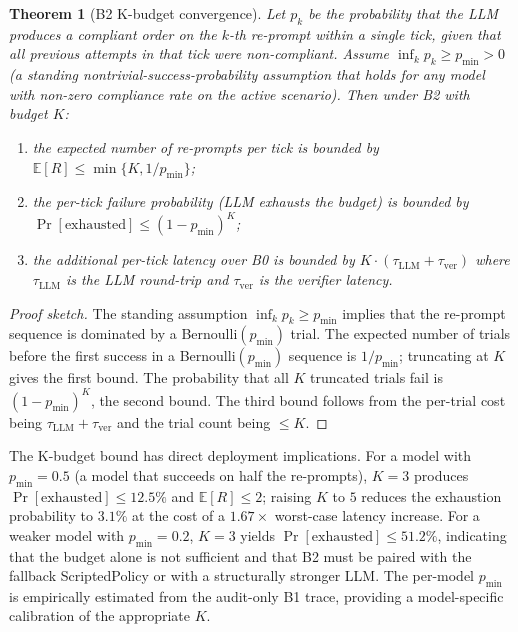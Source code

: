 \documentclass{article}
\newtheorem{theorem}{Theorem}[section]
\theoremstyle{definition}
\begin{document}
\begin{theorem}[B2 K-budget convergence]\label{thm:b2_kbudget}
Let $p_k$ be the probability that the LLM produces a compliant order on the $k$-th re-prompt within a single tick, given that all previous attempts in that tick were non-compliant. Assume $\inf_k p_k \geq p_{\min} > 0$ (a standing nontrivial-success-probability assumption that holds for any model with non-zero compliance rate on the active scenario). Then under B2 with budget $K$:
\begin{enumerate}[nosep]
    \item the expected number of re-prompts per tick is bounded by $\mathbb{E}[R] \leq \min\{K, 1/p_{\min}\}$;
    \item the per-tick failure probability (LLM exhausts the budget) is bounded by $\Pr[\text{exhausted}] \leq (1 - p_{\min})^K$;
    \item the additional per-tick latency over B0 is bounded by $K \cdot (\tau_{\mathrm{LLM}} + \tau_{\mathrm{ver}})$ where $\tau_{\mathrm{LLM}}$ is the LLM round-trip and $\tau_{\mathrm{ver}}$ is the verifier latency.
\end{enumerate}
\end{theorem}

\begin{proof}[Proof sketch]
The standing assumption $\inf_k p_k \geq p_{\min}$ implies that the re-prompt sequence is dominated by a Bernoulli$(p_{\min})$ trial. The expected number of trials before the first success in a Bernoulli$(p_{\min})$ sequence is $1/p_{\min}$; truncating at $K$ gives the first bound. The probability that all $K$ truncated trials fail is $(1-p_{\min})^K$, the second bound. The third bound follows from the per-trial cost being $\tau_{\mathrm{LLM}} + \tau_{\mathrm{ver}}$ and the trial count being $\leq K$.
\end{proof}

The K-budget bound has direct deployment implications. For a model with $p_{\min} = 0.5$ (a model that succeeds on half the re-prompts), $K = 3$ produces $\Pr[\text{exhausted}] \leq 12.5\%$ and $\mathbb{E}[R] \leq 2$; raising $K$ to $5$ reduces the exhaustion probability to $3.1\%$ at the cost of a $1.67\times$ worst-case latency increase. For a weaker model with $p_{\min} = 0.2$, $K = 3$ yields $\Pr[\text{exhausted}] \leq 51.2\%$, indicating that the budget alone is not sufficient and that B2 must be paired with the fallback ScriptedPolicy or with a structurally stronger LLM. The per-model $p_{\min}$ is empirically estimated from the audit-only B1 trace, providing a model-specific calibration of the appropriate $K$.
\end{document}
